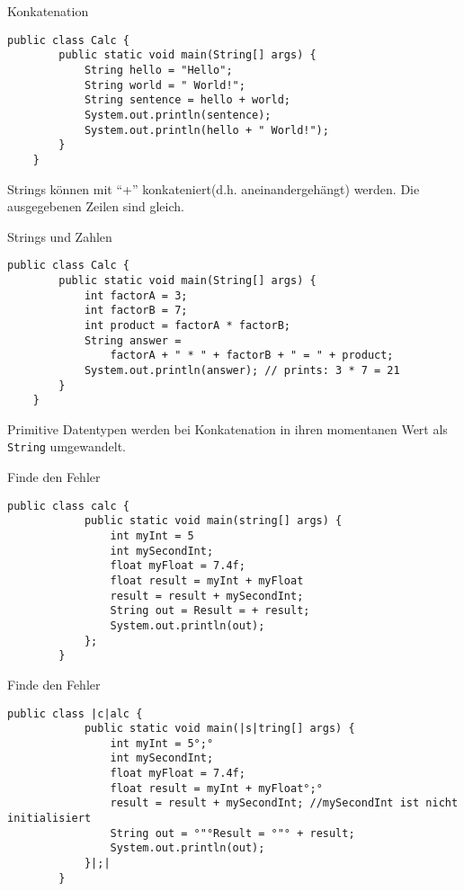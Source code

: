 \begin{frame}[fragile]{Konkatenation}
	\begin{lstlisting}[gobble=4]
	public class Calc {
	    public static void main(String[] args) {
	        String hello = "Hello";
	        String world = " World!";
	        String sentence = hello + world;
	        System.out.println(sentence);
	        System.out.println(hello + " World!");
	    }
	}\end{lstlisting}
    Strings können mit \enquote{+} konkateniert(d.h. aneinandergehängt) werden. 
    Die ausgegebenen Zeilen sind gleich.
\end{frame}

\begin{frame}[fragile]{Strings und Zahlen}
	\begin{lstlisting}[gobble=4]
	public class Calc {
	    public static void main(String[] args) {
	    	int factorA = 3;
	    	int factorB = 7;
	    	int product = factorA * factorB;
	    	String answer =
	            factorA + " * " + factorB + " = " + product;
	        System.out.println(answer); // prints: 3 * 7 = 21
	    }
	}\end{lstlisting}
    Primitive Datentypen werden bei Konkatenation in ihren momentanen Wert als \texttt{String} umgewandelt\footnotemark[1].
\end{frame}

\begin{frame}[fragile]{Finde den Fehler}
    \begin{lstlisting}[gobble=8]
        public class calc {
            public static void main(string[] args) {
                int myInt = 5
                int mySecondInt;
                float myFloat = 7.4f;
                float result = myInt + myFloat
                result = result + mySecondInt;
                String out = Result = + result;
                System.out.println(out);
            };
        }\end{lstlisting}
\end{frame}

\begin{frame}[fragile]{Finde den Fehler}
    \begin{lstlisting}[gobble=8]
        public class |c|alc {
            public static void main(|s|tring[] args) {
                int myInt = 5°;°
                int mySecondInt;
                float myFloat = 7.4f;
                float result = myInt + myFloat°;°
                result = result + mySecondInt; //mySecondInt ist nicht initialisiert
                String out = °"°Result = °"° + result;
                System.out.println(out);
            }|;|
        }\end{lstlisting}
\end{frame}


